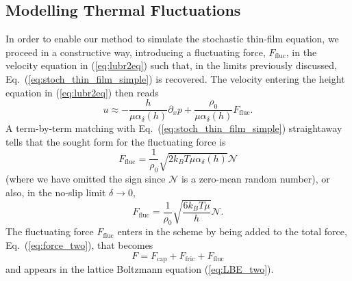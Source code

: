 \subsection{Modelling Thermal Fluctuations}\label{subsec:thermal_fluc_model}
In order to enable our method to simulate the stochastic thin-film equation, we proceed in a constructive way, introducing a fluctuating force, $F_{\text{fluc}}$, in the velocity equation in (\ref{eq:lubr2eq}) such that, in the limits previously discussed, Eq.~(\ref{eq:stoch_thin_film_simple}) is recovered. 
The velocity entering the height equation in (\ref{eq:lubr2eq}) then reads
\begin{equation}
  u \approx -\frac{h}{\mu \alpha_{\delta}(h)}\partial_x p + \frac{\rho_0}{\mu \alpha_{\delta}(h)}F_{\text{fluc}}.
\end{equation}
A term-by-term matching with Eq.~(\ref{eq:stoch_thin_film_simple}) straightaway tells that the sought form for the fluctuating force is
\begin{equation}
    F_{\text{fluc}} = \frac{1}{\rho_0} \sqrt{2 k_B T \mu \alpha_{\delta}(h)}\mathcal{N}
\end{equation}
(where we have omitted the sign since $\mathcal{N}$ is a zero-mean random number), or also, in the no-slip limit $\delta \rightarrow 0$, 
\begin{equation}\label{eq:thermal_force}
    F_{\text{fluc}} = \frac{1}{\rho_0}\sqrt{\frac{6k_BT\mu}{h}}\mathcal{N}.
\end{equation}
The fluctuating force $F_{\text{fluc}}$ enters in the scheme by being added to the total force, Eq.~(\ref{eq:force_two}), that becomes
\begin{equation}\label{eq:tot_force}
  F = F_{\text{cap}} + F_{\text{fric}} + F_{\text{fluc}}
\end{equation}
and appears in the lattice Boltzmann equation (\ref{eq:LBE_two}).


